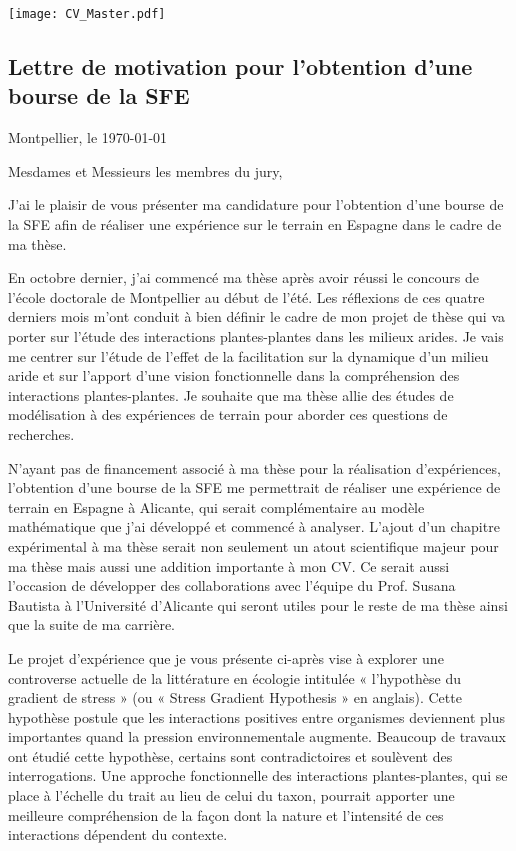 \documentclass[12pt]{article} %
\begin{document}


\begin{center}
\texttt{[image: CV\_Master.pdf]}
\end{center}

\subsection{Lettre de motivation pour l’obtention d’une bourse de la SFE}

\begin{flushright}
Montpellier, le \today
\end{flushright}
Mesdames et Messieurs les membres du jury,

J’ai le plaisir de vous présenter ma candidature pour l’obtention d'une bourse de la SFE afin de réaliser une expérience sur le terrain en Espagne dans le cadre de ma thèse. 

En octobre dernier, j'ai commencé ma thèse après avoir réussi le concours de l’école doctorale de Montpellier au début de l'été. Les réflexions de ces quatre derniers mois m’ont conduit à bien définir le cadre de mon projet de thèse qui va porter sur l'étude des interactions plantes-plantes dans les milieux arides. Je vais me centrer sur l'étude de l'effet de la facilitation sur la dynamique d'un milieu aride et sur l'apport d'une vision fonctionnelle dans la compréhension des interactions plantes-plantes. Je souhaite que ma thèse allie des études de modélisation à des expériences de terrain pour aborder ces questions de recherches.

N’ayant pas de financement associé à ma thèse pour la réalisation d’expériences, l’obtention d’une bourse de la SFE me permettrait de réaliser une expérience de terrain en Espagne à Alicante, qui serait complémentaire au modèle mathématique que j’ai développé et commencé à analyser. L’ajout d’un chapitre expérimental à ma thèse serait non seulement un atout scientifique majeur pour ma thèse mais aussi une addition importante à mon CV. Ce serait aussi l’occasion de développer des collaborations avec l’équipe du Prof. Susana Bautista à l’Université d’Alicante qui seront utiles pour le reste de ma thèse ainsi que la suite de ma carrière.

Le projet d’expérience que je vous présente ci-après vise à explorer une controverse actuelle de la littérature en écologie intitulée « l’hypothèse du gradient de stress » (ou « Stress Gradient Hypothesis » en anglais). Cette hypothèse postule que les interactions positives entre organismes deviennent plus importantes quand la pression environnementale augmente. Beaucoup de travaux ont étudié cette hypothèse, certains sont contradictoires et soulèvent des interrogations. Une approche fonctionnelle des interactions plantes-plantes, qui se place à l'échelle du trait au lieu de celui du taxon, pourrait apporter une meilleure compréhension de la façon dont la nature et l'intensité de ces interactions dépendent du contexte.
\end{document}
